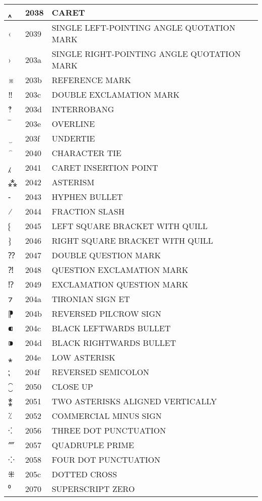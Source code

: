 \documentclass[12pt,letterpaper,openany]{book}
\begin{document}
\begin{center}
\begin{supertabular}{|m{0.25in}|m{0.5in}|m{4in}|}
			‸ & 2038 & CARET\\\hline
			‹ & 2039 & SINGLE LEFT-POINTING ANGLE QUOTATION MARK\\\hline
			› & 203a & SINGLE RIGHT-POINTING ANGLE QUOTATION MARK\\\hline
			※ & 203b & REFERENCE MARK\\\hline
			‼ & 203c & DOUBLE EXCLAMATION MARK\\\hline
			‽ & 203d & INTERROBANG\\\hline
			‾ & 203e & OVERLINE\\\hline
			‿ & 203f & UNDERTIE\\\hline
			⁀ & 2040 & CHARACTER TIE\\\hline
			⁁ & 2041 & CARET INSERTION POINT\\\hline
			⁂ & 2042 & ASTERISM\\\hline
			⁃ & 2043 & HYPHEN BULLET\\\hline
			⁄ & 2044 & FRACTION SLASH\\\hline
			⁅ & 2045 & LEFT SQUARE BRACKET WITH QUILL\\\hline
			⁆ & 2046 & RIGHT SQUARE BRACKET WITH QUILL\\\hline
			⁇ & 2047 & DOUBLE QUESTION MARK\\\hline
			⁈ & 2048 & QUESTION EXCLAMATION MARK\\\hline
			⁉ & 2049 & EXCLAMATION QUESTION MARK\\\hline
			⁊ & 204a & TIRONIAN SIGN ET\\\hline
			⁋ & 204b & REVERSED PILCROW SIGN\\\hline
			⁌ & 204c & BLACK LEFTWARDS BULLET\\\hline
			⁍ & 204d & BLACK RIGHTWARDS BULLET\\\hline
			⁎ & 204e & LOW ASTERISK\\\hline
			⁏ & 204f & REVERSED SEMICOLON\\\hline
			⁐ & 2050 & CLOSE UP\\\hline
			⁑ & 2051 & TWO ASTERISKS ALIGNED VERTICALLY\\\hline
			⁒ & 2052 & COMMERCIAL MINUS SIGN\\\hline
			⁖ & 2056 & THREE DOT PUNCTUATION\\\hline
			⁗ & 2057 & QUADRUPLE PRIME\\\hline
			⁘ & 2058 & FOUR DOT PUNCTUATION\\\hline
			⁜ & 205c & DOTTED CROSS\\\hline
			⁰ & 2070 & SUPERSCRIPT ZERO\\\hline

\end{supertabular}
\end{center}
\end{document}
